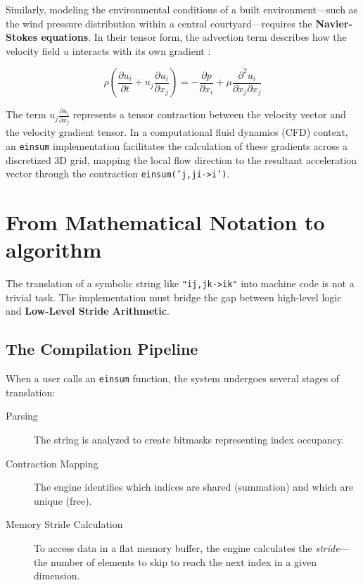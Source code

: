 \documentclass[binding=0.6cm]{sapthesis}
\begin{document}

Similarly, modeling the environmental conditions of a built environment—such as the wind pressure distribution within a central courtyard—requires the \textbf{Navier-Stokes equations}. In their tensor form, the advection term describes how the velocity field $u$ interacts with its own gradient \cite{batchelor1967fluid}:

\begin{equation}
	\rho \left( \frac{\partial u_i}{\partial t} + u_j \frac{\partial u_i}{\partial x_j} \right) = -\frac{\partial p}{\partial x_i} + \mu \frac{\partial^2 u_i}{\partial x_j \partial x_j}
\end{equation}

The term $u_j \frac{\partial u_i}{\partial x_j}$ represents a tensor contraction between the velocity vector and the velocity gradient tensor. In a computational fluid dynamics (CFD) context, an \texttt{einsum} implementation facilitates the calculation of these gradients across a discretized 3D grid, mapping the local flow direction to the resultant acceleration vector through the contraction \texttt{einsum('j,ji->i')}.

\section{From Mathematical Notation to algorithm}

The translation of a symbolic string like \texttt{"ij,jk->ik"} into machine code is not a trivial task. The implementation must bridge the gap between high-level logic and \textbf{Low-Level Stride Arithmetic}.

\subsection{The Compilation Pipeline}

When a user calls an \texttt{einsum} function, the system undergoes several stages of translation:
\begin{description}
	\item [Parsing] The string is analyzed to create bitmasks representing index occupancy.
	\item [Contraction Mapping] The engine identifies which indices are shared (summation) and which are unique (free).
	\item [Memory Stride Calculation] To access data in a flat memory buffer, the engine calculates the \textit{stride}—the number of elements to skip to reach the next index in a given dimension.
\end{description}
\end{document}

